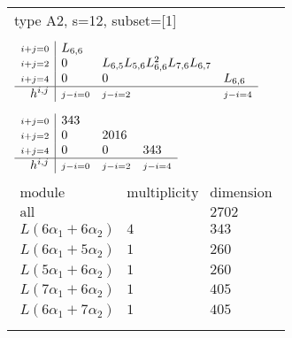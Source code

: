 \documentclass[crop,border=2mm]{standalone}
\begin{document}
\begin{tabular}{l}
{\huge type A2, s=12, subset=[1]}\\ \\


$\displaystyle
\begin{array}{r|l l l}
	{\scriptstyle i+j=0}&L_{6,6}&&\\
	{\scriptstyle i+j=2}&0&L_{6,5}L_{5,6}L_{6,6}^{2}L_{7,6}L_{6,7}&\\
	{\scriptstyle i+j=4}&0&0&L_{6,6}\\
	\hline h^{i,j}&{\scriptstyle j-i=0}&{\scriptstyle j-i=2}&{\scriptstyle j-i=4}
\end{array}
$ \\ \\


$\displaystyle
\begin{array}{r|l l l}
	{\scriptstyle i+j=0}&343&&\\
	{\scriptstyle i+j=2}&0&2016&\\
	{\scriptstyle i+j=4}&0&0&343\\
	\hline h^{i,j}&{\scriptstyle j-i=0}&{\scriptstyle j-i=2}&{\scriptstyle j-i=4}
\end{array}
$ \\ \\


$\displaystyle
\begin{array}{rll}
	\text{module}&\text{multiplicity}&\text{dimension} \\ \hline \text{all}&&2702 \\
	L\left( 6\alpha_{1}+ 6\alpha_{2}\right)&4&343\\
	L\left( 6\alpha_{1}+ 5\alpha_{2}\right)&1&260\\
	L\left( 5\alpha_{1}+ 6\alpha_{2}\right)&1&260\\
	L\left( 7\alpha_{1}+ 6\alpha_{2}\right)&1&405\\
	L\left( 6\alpha_{1}+ 7\alpha_{2}\right)&1&405
\end{array}
$ \\ \\

\end{tabular}
\end{document}
